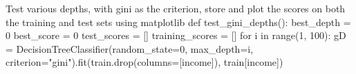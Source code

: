 \documentclass[
  letterpaper,
  DIV=11,
  numbers=noendperiod]{scrartcl}
\newenvironment{Shaded}{\begin{snugshade}}{\end{snugshade}}
\newcommand{\BuiltInTok}[1]{\textcolor[rgb]{0.00,0.23,0.31}{#1}}
\newcommand{\CommentTok}[1]{\textcolor[rgb]{0.37,0.37,0.37}{#1}}
\newcommand{\ControlFlowTok}[1]{\textcolor[rgb]{0.00,0.23,0.31}{#1}}
\newcommand{\DecValTok}[1]{\textcolor[rgb]{0.68,0.00,0.00}{#1}}
\newcommand{\KeywordTok}[1]{\textcolor[rgb]{0.00,0.23,0.31}{#1}}
\newcommand{\NormalTok}[1]{\textcolor[rgb]{0.00,0.23,0.31}{#1}}
\newcommand{\OperatorTok}[1]{\textcolor[rgb]{0.37,0.37,0.37}{#1}}
\newcommand{\StringTok}[1]{\textcolor[rgb]{0.13,0.47,0.30}{#1}}
\begin{document}
\begin{Shaded}
\begin{Highlighting}[]
\CommentTok{\textquotesingle{}\textquotesingle{}\textquotesingle{}Test various depths, with gini as the criterion,}
\CommentTok{store and plot the scores on both the training and test sets using matplotlib\textquotesingle{}\textquotesingle{}\textquotesingle{}}
\KeywordTok{def}\NormalTok{ test\_gini\_depths():}
\NormalTok{    best\_depth }\OperatorTok{=} \DecValTok{0}
\NormalTok{    best\_score }\OperatorTok{=} \DecValTok{0}
\NormalTok{    test\_scores }\OperatorTok{=}\NormalTok{ []}
\NormalTok{    training\_scores }\OperatorTok{=}\NormalTok{ []}
    \ControlFlowTok{for}\NormalTok{ i }\KeywordTok{in} \BuiltInTok{range}\NormalTok{(}\DecValTok{1}\NormalTok{, }\DecValTok{100}\NormalTok{):}
\NormalTok{        gD }\OperatorTok{=}\NormalTok{ DecisionTreeClassifier(random\_state}\OperatorTok{=}\DecValTok{0}\NormalTok{, max\_depth}\OperatorTok{=}\NormalTok{i, }
\NormalTok{        criterion}\OperatorTok{=}\StringTok{"gini"}\NormalTok{).fit(train.drop(columns}\OperatorTok{=}\NormalTok{[}\StringTok{\textquotesingle{}income\textquotesingle{}}\NormalTok{]), train[}\StringTok{\textquotesingle{}income\textquotesingle{}}\NormalTok{])}
        

\end{Highlighting}
\end{Shaded}
\end{document}
